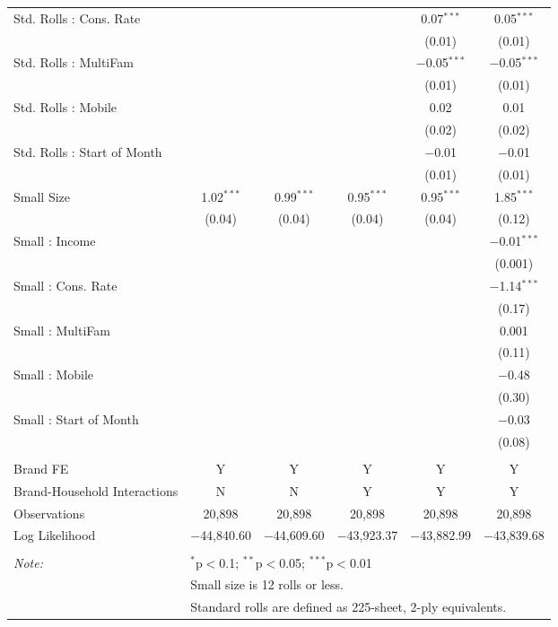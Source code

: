 \begin{table}[!htbp]
\begin{tabular}{@{\extracolsep{5pt}}lccccc}
  Std. Rolls : Cons. Rate &  &  &  & 0.07$^{***}$ & 0.05$^{***}$ \\ 
  &  &  &  & (0.01) & (0.01) \\ 
  Std. Rolls : MultiFam &  &  &  & $-$0.05$^{***}$ & $-$0.05$^{***}$ \\ 
  &  &  &  & (0.01) & (0.01) \\ 
  Std. Rolls : Mobile &  &  &  & 0.02 & 0.01 \\ 
  &  &  &  & (0.02) & (0.02) \\ 
  Std. Rolls : Start of Month &  &  &  & $-$0.01 & $-$0.01 \\ 
  &  &  &  & (0.01) & (0.01) \\ 
  Small Size & 1.02$^{***}$ & 0.99$^{***}$ & 0.95$^{***}$ & 0.95$^{***}$ & 1.85$^{***}$ \\ 
  & (0.04) & (0.04) & (0.04) & (0.04) & (0.12) \\ 
  Small : Income &  &  &  &  & $-$0.01$^{***}$ \\ 
  &  &  &  &  & (0.001) \\ 
  Small : Cons. Rate &  &  &  &  & $-$1.14$^{***}$ \\ 
  &  &  &  &  & (0.17) \\ 
  Small : MultiFam &  &  &  &  & 0.001 \\ 
  &  &  &  &  & (0.11) \\ 
  Small : Mobile &  &  &  &  & $-$0.48 \\ 
  &  &  &  &  & (0.30) \\ 
  Small : Start of Month &  &  &  &  & $-$0.03 \\ 
  &  &  &  &  & (0.08) \\ 
 \hline \\[-1.8ex] 
Brand FE & Y & Y & Y & Y & Y \\ 
Brand-Household Interactions & N & N & Y & Y & Y \\ 
Observations & 20,898 & 20,898 & 20,898 & 20,898 & 20,898 \\ 
Log Likelihood & $-$44,840.60 & $-$44,609.60 & $-$43,923.37 & $-$43,882.99 & $-$43,839.68 \\ 
\hline 
\hline \\[-1.8ex] 
\textit{Note:}  & \multicolumn{5}{l}{$^{*}$p$<$0.1; $^{**}$p$<$0.05; $^{***}$p$<$0.01} \\ 
 & \multicolumn{5}{l}{Small size is 12 rolls or less.} \\ 
 & \multicolumn{5}{l}{Standard rolls are defined as 225-sheet, 2-ply equivalents.} \\ 
\end{tabular} 
\end{table} 

